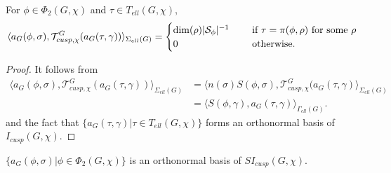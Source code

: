 \documentclass[11pt,letterpaper]{amsart}
\numberwithin{equation}{section}
\begin{document}
\begin{lemma}
For $\phi \in \Phi_2(G, \chi)$ and $\tau \in T_{ell}(G, \chi)$,
\begin{align*}
\langle a_{G}(\phi, \sigma), \mathcal{T}^{G}_{cusp, \chi}(a_{G}(\tau, \gamma)) \rangle_{\Sigma_{ell}(G)} = \begin{cases} {\rm dim}(\rho)|\mathcal{S}_{\phi}|^{-1} \quad & \text{ if } \tau = \pi(\phi, \rho) \text{ for some } \rho\\
0 \quad & \text{ otherwise. }
\end{cases} 
\end{align*}
\end{lemma}

\begin{proof}
It follows from
\begin{align*}
\langle a_{G}(\phi, \sigma), \mathcal{T}^{G}_{cusp, \chi}(a_{G}(\tau, \gamma)) \rangle_{\Sigma_{ell}(G)} & = \langle n(\sigma)S(\phi, \sigma), \mathcal{T}^{G}_{cusp, \chi}(a_{G}(\tau, \gamma) \rangle_{\Sigma_{ell}(G)} \\
&= \langle S(\phi, \gamma), a_{G}(\tau, \gamma) \rangle_{\Gamma_{ell}(G)}.
\end{align*}
and the fact that $\{a_{G}(\tau, \gamma)\vert \tau \in T_{ell}(G, \chi)\}$ forms an orthonormal basis of $I_{cusp}(G, \chi)$.
\end{proof}


\begin{proposition}
\label{prop: elliptic stable basis}
$\{a_{G}(\phi, \sigma) \vert\phi \in \Phi_2(G, \chi)\}$ is an orthonormal basis of $SI_{cusp}(G, \chi)$.
\end{proposition}
\end{document}
